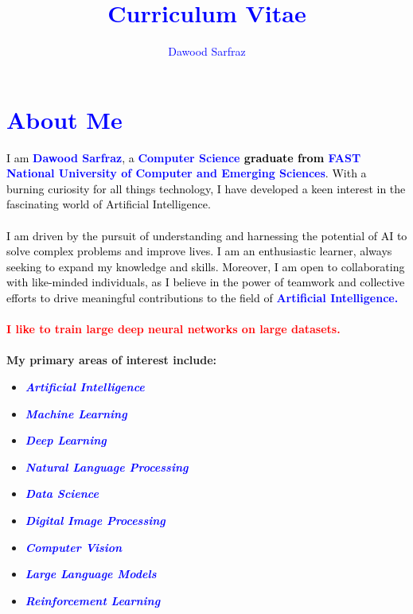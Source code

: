 \documentclass[a4paper,15pt]{article}
\title{\textcolor{blue}{Curriculum Vitae}}
\author{\textcolor{blue}{Dawood Sarfraz}}
\date{}
\begin{document}
	
	\maketitle
	
	\section*{\textcolor{blue}{About Me}}
	\textcolor{black}{I am \textbf{\textcolor{blue}{Dawood Sarfraz}}, a \textbf{\textcolor{blue}{Computer Science} graduate from \textbf{\textcolor{blue}{FAST National University of Computer and Emerging Sciences}}}. With a burning curiosity for all things technology, I have developed a keen interest in the fascinating world of Artificial Intelligence.
	\\
	\\
	I am driven by the pursuit of understanding and harnessing the potential of AI to solve complex problems and improve lives. I am an enthusiastic learner, always seeking to expand my knowledge and skills. Moreover, I am open to collaborating with like-minded individuals, as I believe in the power of teamwork and collective efforts to drive meaningful contributions to the field of \textbf{\textcolor{blue}{Artificial Intelligence.}}}
	\\
	\\
	\textbf{\textcolor{red}{I like to train large deep neural networks on large datasets.}}\\ \\
	\textbf{My primary areas of interest include:}
	
	\begin{itemize}
		\item \textbf{\textit{\textcolor{blue}{Artificial Intelligence}}}
		\item \textbf{\textit{\textcolor{blue}{Machine Learning}}}
		\item \textbf{\textit{\textcolor{blue}{Deep Learning}}}
		\item \textbf{\textit{\textcolor{blue}{Natural Language Processing}}}
		\item \textbf{\textit{\textcolor{blue}{Data Science}}}
		\item \textbf{\textit{\textcolor{blue}{Digital Image Processing}}}
		\item \textbf{\textit{\textcolor{blue}{Computer Vision}}}
		\item \textbf{\textit{\textcolor{blue}{Large Language Models}}}
		\item \textbf{\textit{\textcolor{blue}{Reinforcement Learning}}}
	\end{itemize}
	
\end{document}
